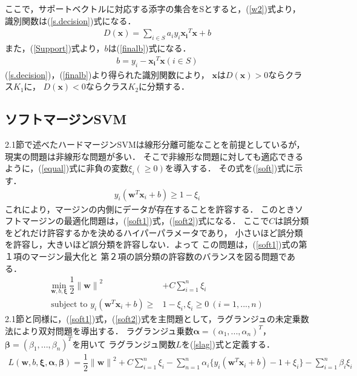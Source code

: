 ここで，サポートベクトルに対応する添字の集合をSとすると，(\ref{w2})式より，
識別関数は(\ref{s.decision})式になる．
\begin{align}
    \label{s.decision}
    D(\boldsymbol{x}) = \sum_{i\in S}a_iy_i\boldsymbol{x_i}^T\boldsymbol{x} + b
\end{align}
また，(\ref{Support})式より，$b$は(\ref{finalb})式になる．
\begin{align}
  \label{finalb}
  b =y_i - \boldsymbol{x_i}^T\boldsymbol{x}(i \in S)
\end{align}
(\ref{s.decision})，(\ref{finalb})より得られた識別関数により，
$\boldsymbol{x}$は$D(\boldsymbol{x}) > 0$ならクラス$K_1$に，
$D(\boldsymbol{x}) < 0$ならクラス$K_2$に分類する．

\subsection{ソフトマージンSVM}
2.1節で述べたハードマージンSVMは線形分離可能なことを前提としているが，現実の問題は非線形な問題が多い．
そこで非線形な問題に対しても適応できるように，(\ref{equal})式に非負の変数$\xi_i(\geq 0)$を導入する．
その式を(\ref{soft})式に示す．
\begin{align}
    \label{soft}
    y_i(\boldsymbol{w}^T \boldsymbol{x}_i + b) \geq 1 - \xi_i
\end{align}
これにより，マージンの内側にデータが存在することを許容する．
このときソフトマージンの最適化問題は，(\ref{soft1})式，(\ref{soft2})式になる．
ここで$C$は誤分類をどれだけ許容するかを決めるハイパーパラメータであり，
小さいほど誤分類を許容し，大きいほど誤分類を許容しない．よって
この問題は，(\ref{soft1})式の第１項のマージン最大化と
第２項の誤分類の許容数のバランスを図る問題である．
\begin{subequations}
\begin{align}
    \underset{\boldsymbol{w},b,\boldsymbol{\xi}}{\text{min}}~\dfrac{1}{2}{\|\boldsymbol{{w}}\|}^2
    &+C\sum_{i=1}^{n}\xi_i \label{soft1}\\
   \text{subject to } y_i(\boldsymbol{w}^T \boldsymbol{x}_i + b) \geq &1 - \xi_i,\xi_i \geq 0 ~(i=1,...,n)\label{soft2}
\end{align}
\end{subequations}
2.1節と同様に，(\ref{soft1})式，(\ref{soft2})式を主問題として，ラグランジュの未定乗数法により双対問題を導出する．
ラグランジュ乗数$\boldsymbol{\alpha} = (\alpha_1,...,\alpha_n)^T$，
$\boldsymbol{\beta} = (\beta_1,...,\beta_n)^T$を用いて
ラグランジュ関数$L$を(\ref{slag})式と定義する．
\begin{align}
    \label{slag}
    L(\boldsymbol{w},b,\boldsymbol{\xi},\boldsymbol{\alpha},\boldsymbol{\beta}) 
    = \dfrac{1}{2}{\|\boldsymbol{{w}}\|}^2+C\sum_{i=1}^{n}\xi_i
    - \sum_{n = 1}^{n} \alpha_i \{y_i(\boldsymbol{w}^T \boldsymbol{x}_i + b)-1+\xi_i\}
    -\sum_{i=1}^{n}\beta_i\xi_i
\end{align}
